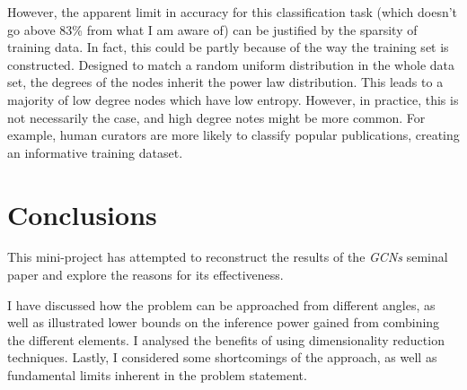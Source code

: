 \documentclass[10pt,a4]{article}
\begin{document}
    However, the apparent limit in accuracy for this classification task (which doesn't
    go above 83\% from what I am aware of) can be justified by the sparsity of 
    training data. In fact, this could be partly because of the way the training 
    set is constructed. Designed to match a random uniform distribution in the whole 
    data set, the degrees of the nodes inherit the power law distribution. This leads 
    to a majority of low degree nodes which have low entropy. However, in practice, 
    this is not necessarily the case, and high degree notes might be more common.
    For example, human curators are more likely to classify popular  publications, 
    creating an informative training dataset. 

    \section{Conclusions}

    This mini-project has attempted to reconstruct the results of the \emph{GCNs}
    seminal paper \cite{kipf2016semi} and explore the reasons for its effectiveness.

    I have discussed how the problem can be approached from different angles, as well as 
    illustrated lower bounds on the inference power gained from 
    combining the different elements. I analysed the benefits of using 
    dimensionality reduction techniques. Lastly, I considered some shortcomings of 
    the approach, as well as fundamental limits inherent in the problem statement.

    

    
    




    \newpage
    
    
\end{document}

